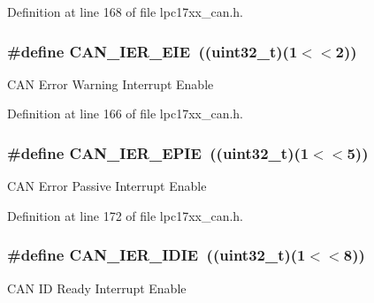 \-Definition at line 168 of file lpc17xx\-\_\-can.\-h.

\hypertarget{group___c_a_n___private___macros_ga7c5a45cabe99423ecbbd05df116dad20}{
\subsubsection[{\-C\-A\-N\-\_\-\-I\-E\-R\-\_\-\-E\-I\-E}]{\setlength{\rightskip}{0pt plus 5cm}\#define {\bf \-C\-A\-N\-\_\-\-I\-E\-R\-\_\-\-E\-I\-E}~((uint32\-\_\-t)(1$<$$<$2))}}\label{group___c_a_n___private___macros_ga7c5a45cabe99423ecbbd05df116dad20}
\-C\-A\-N \-Error \-Warning \-Interrupt \-Enable 

\-Definition at line 166 of file lpc17xx\-\_\-can.\-h.

\hypertarget{group___c_a_n___private___macros_gae01dedfd23e22e9fb22466c4a8ef7b9d}{
\subsubsection[{\-C\-A\-N\-\_\-\-I\-E\-R\-\_\-\-E\-P\-I\-E}]{\setlength{\rightskip}{0pt plus 5cm}\#define {\bf \-C\-A\-N\-\_\-\-I\-E\-R\-\_\-\-E\-P\-I\-E}~((uint32\-\_\-t)(1$<$$<$5))}}\label{group___c_a_n___private___macros_gae01dedfd23e22e9fb22466c4a8ef7b9d}
\-C\-A\-N \-Error \-Passive \-Interrupt \-Enable 

\-Definition at line 172 of file lpc17xx\-\_\-can.\-h.

\hypertarget{group___c_a_n___private___macros_gac81c8d3f2c4417b30af2236ae66c4926}{
\subsubsection[{\-C\-A\-N\-\_\-\-I\-E\-R\-\_\-\-I\-D\-I\-E}]{\setlength{\rightskip}{0pt plus 5cm}\#define {\bf \-C\-A\-N\-\_\-\-I\-E\-R\-\_\-\-I\-D\-I\-E}~((uint32\-\_\-t)(1$<$$<$8))}}\label{group___c_a_n___private___macros_gac81c8d3f2c4417b30af2236ae66c4926}
\-C\-A\-N \-I\-D \-Ready \-Interrupt \-Enable 

